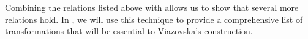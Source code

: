 Combining the relations listed above with  allows us to show that several more relations hold. In , we will use this technique to provide a comprehensive list of transformations that will be essential to Viazovska's construction.

